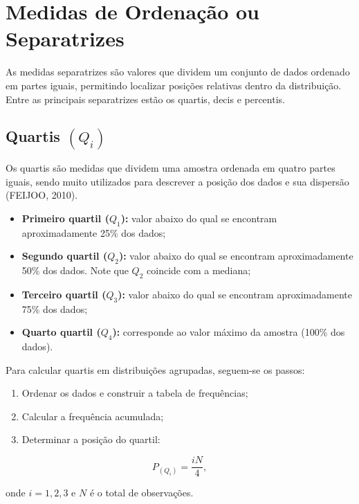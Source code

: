 \section{Medidas de Ordenação ou Separatrizes}

As medidas separatrizes são valores que dividem um conjunto de dados ordenado
em partes iguais, permitindo localizar posições relativas dentro da distribuição.
Entre as principais separatrizes estão os quartis, decis e percentis.

\subsection{Quartis $(Q_i)$}

Os quartis são medidas que dividem uma amostra ordenada em quatro partes iguais,
sendo muito utilizados para descrever a posição dos dados e sua dispersão
(FEIJOO, 2010).

\begin{itemize}
    \item \textbf{Primeiro quartil ($Q_1$):} valor abaixo do qual se encontram
    aproximadamente 25\% dos dados;
    \item \textbf{Segundo quartil ($Q_2$):} valor abaixo do qual se encontram
    aproximadamente 50\% dos dados. Note que $Q_2$ coincide com a mediana;
    \item \textbf{Terceiro quartil ($Q_3$):} valor abaixo do qual se encontram
    aproximadamente 75\% dos dados;
    \item \textbf{Quarto quartil ($Q_4$):} corresponde ao valor máximo da amostra
    (100\% dos dados).
\end{itemize}


Para calcular quartis em distribuições agrupadas, seguem-se os passos:

\begin{enumerate}
    \item Ordenar os dados e construir a tabela de frequências;
    \item Calcular a frequência acumulada;
    \item Determinar a posição do quartil:
\end{enumerate}

\begin{equation}
P_{(Q_i)}=\frac{iN}{4},
\end{equation}

onde $i=1,2,3$ e $N$ é o total de observações.\vskip0.3cm


